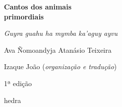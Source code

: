 




\begingroup\thispagestyle{empty}\vspace*{.05\textheight} 

              {\formular
              \Huge
              \noindent
              \textbf{Cantos dos animais\\primordiais}
              
              \vspace{0.3em}

              \noindent\large\textit{Guyra guahu ha mymba ka’aguy ayvu}

              \vspace{3em}
              
              \Large\noindent
              Ava Ñomoandyja Atanásio Teixeira
              }
              \vspace{3em}
              
              {\small\noindent Izaque João (\textit{organização e tradução})}

              \bigskip

              \noindent
              {\small\noindent 1ª edição}

              \vfill

              \newfontfamily{}
              {\noindent\fontsize{30}{40}\selectfont \timesnewroman hedra}


\endgroup
\pagebreak
